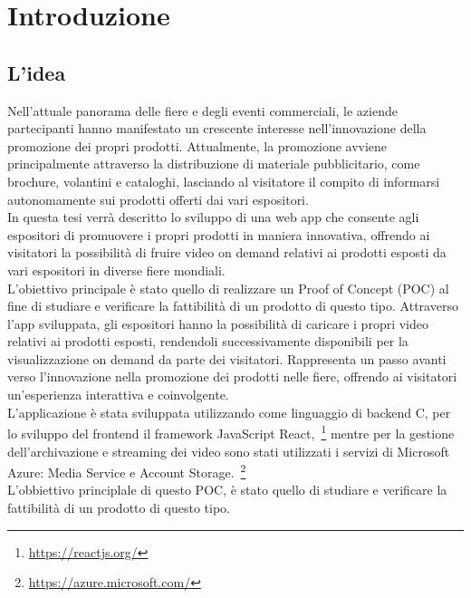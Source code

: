 \chapter{Introduzione}
\label{cap:introduzione}




\section{L'idea}

Nell'attuale panorama delle fiere e degli eventi commerciali, le aziende partecipanti hanno manifestato un crescente interesse nell'innovazione della promozione 
dei propri prodotti. Attualmente, la promozione avviene principalmente attraverso la distribuzione di materiale pubblicitario, come brochure, volantini e cataloghi, 
lasciando al visitatore il compito di informarsi autonomamente sui prodotti offerti dai vari espositori.\\
In questa tesi verrà descritto lo sviluppo di una web app che consente agli espositori di promuovere i propri prodotti in maniera innovativa, 
offrendo ai visitatori la possibilità di fruire video on demand relativi ai prodotti esposti da vari espositori in diverse fiere mondiali.\\
L'obiettivo principale è stato quello di realizzare un Proof of Concept (POC) al fine di studiare e verificare la fattibilità di 
un prodotto di questo tipo. Attraverso l'app sviluppata, gli espositori hanno la possibilità di caricare i propri video relativi ai prodotti esposti, 
rendendoli successivamente disponibili per la visualizzazione on demand da parte dei visitatori.
Rappresenta un passo avanti verso l'innovazione nella promozione dei prodotti nelle fiere, offrendo ai visitatori un'esperienza interattiva 
e coinvolgente. \\
L'applicazione è stata sviluppata utilizzando come linguaggio di backend C, per lo sviluppo del frontend il framework JavaScript React,~\footnote{\url{https://reactjs.org/}}  
mentre per la gestione dell'archivazione e streaming dei video sono stati utilizzati i servizi di Microsoft Azure: Media Service e Account Storage.~\footnote{\url{https://azure.microsoft.com/}}\\
L'obbiettivo principlale di questo POC, è stato quello di studiare e verificare la fattibilità di un prodotto di questo tipo.\\

